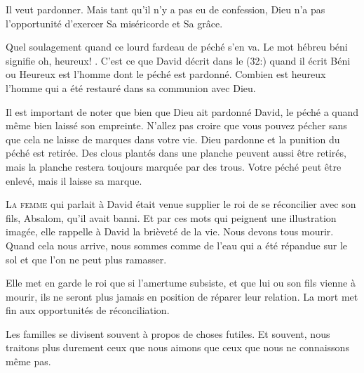 Il veut pardonner.
 Mais tant qu'il n'y a pas eu de confession,
 Dieu n'a pas l'opportunité d'exercer Sa miséricorde et Sa grâce. 

Quel soulagement quand ce lourd fardeau de péché s'en va.
 Le mot hébreu \og béni \fg{} signifie \og oh, heureux! \fg{}.
 C'est ce que David décrit dans le (32:)
 quand il écrit \og Béni \fg{} ou \og Heureux \fg{} est l'homme
 dont le péché est pardonné.
 Combien est heureux l'homme qui a été restauré
 dans sa communion avec Dieu. 

Il est important de noter que bien que Dieu ait pardonné David,
 le péché a quand même bien laissé son empreinte.
 N'allez pas croire que vous pouvez pécher sans que cela ne laisse
 de marques dans votre vie.
 Dieu pardonne et la punition du péché est retirée.
 Des clous plantés dans une planche peuvent aussi être retirés,
 mais la planche restera toujours marquée par des trous.
 Votre péché peut être enlevé, mais il laisse sa marque. 

\dvrule







\lettrine{L}{a femme} qui parlait à David était venue supplier
 le roi de se réconcilier avec son fils, Absalom, qu'il avait banni.
 Et par ces mots qui peignent une illustration imagée, elle rappelle à David
 la brièveté de la vie. Nous devons tous mourir.
 Quand cela nous arrive, nous sommes comme de l'eau qui a été répandue
 sur le sol et que l'on ne peut plus ramasser. 

Elle met en garde le roi que si l'amertume subsiste, et que lui ou son fils
 vienne à mourir, ils ne seront plus jamais en position
 de réparer leur relation.
 La mort met fin aux opportunités de réconciliation. 

Les familles se divisent souvent à propos de choses futiles.
 Et souvent, nous traitons plus durement ceux que nous aimons
 que ceux que nous ne connaissons même pas. 


